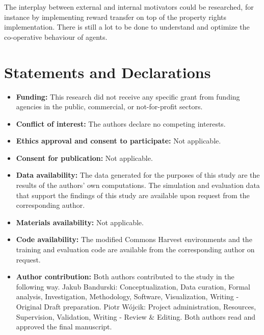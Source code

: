 \documentclass[pdflatex,sn-basic,lineno]{sn-jnl}
\theoremstyle{thmstyleone}%
\theoremstyle{thmstyletwo}%
\theoremstyle{thmstylethree}%
\begin{document}
The interplay between external and internal motivators could be researched, for instance by implementing reward transfer
on top of the property rights implementation. There is still a lot to be done to understand and optimize the
co-operative behaviour of agents.

\backmatter

\section*{Statements and Declarations}

\begin{itemize}
\item \textbf{Funding:} This research did not receive any specific grant from funding agencies in the public,
commercial, or not-for-profit sectors.
\item \textbf{Conflict of interest:} The authors declare no competing interests.
\item \textbf{Ethics approval and consent to participate:} Not applicable.
\item \textbf{Consent for publication:} Not applicable.
\item \textbf{Data availability:} The data generated for the purposes of this study are the results of the authors' own
computations. The simulation and evaluation data that support the findings of this study are available upon request from
the corresponding author.
\item \textbf{Materials availability:} Not applicable.
\item \textbf{Code availability:} The modified Commons Harvest environments and the training and evaluation code are
available from the corresponding author on request.
\item \textbf{Author contribution:} Both authors contributed to the study in the following way. Jakub Bandurski: 
Conceptualization, Data curation, Formal analysis, Investigation, Methodology, Software, Visualization, 
Writing - Original Draft preparation. Piotr Wójcik: Project administration, Resources, Supervision, Validation, 
Writing - Review \& Editing. Both authors read and approved the final manuscript.
\end{itemize}


\end{document}
